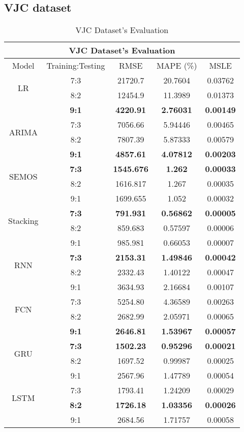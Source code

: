 \documentclass{ieeeojies}
\begin{document}
\subsection{VJC dataset} 
\begin{table}[H]
    \centering
    \begin{tabular}{|c|c|c|c|c|}
         \hline
         \multicolumn{5}{|c|}{\textbf{VJC Dataset's Evaluation}}\\
         \hline
         \centering Model & Training:Testing & RMSE & MAPE (\%) & MSLE\\
         \hline
         \multirow{2}{*}{LR} & 7:3 & 21720.7 & 20.7604 & 0.03762 \\ & 8:2 & 12454.9 & 11.3989 & 0.01373 \\ & \textbf{9:1} & \textbf{4220.91} & \textbf{2.76031} & \textbf{0.00149}\\
         \hline
         \multirow{2}{*}{ARIMA} & 7:3&7056.66&5.94446&0.00465\\ & 8:2&7807.39&5.87333&0.00579 \\ & \textbf{9:1} & \textbf{4857.61} & \textbf{4.07812} &\textbf{0.00203}\\
         \hline
         \multirow{2}{*}{SEMOS} & \textbf{7:3}	& \textbf{1545.676} & \textbf{1.262} & \textbf{0.00033} \\ & 8:2 & 1616.817 & 1.267 & 0.00035 \\ & 9:1 & 1699.655  & 1.052 & 0.00032\\
         \hline
         \multirow{2}{*}{Stacking} & \textbf{7:3} & \textbf{791.931} &  \textbf{0.56862} &  \textbf{0.00005} \\ & 8:2 &  859.683 & 0.57597 & 0.00006 \\ & 9:1 & 985.981 & 0.66053 & 0.00007\\
         \hline
         \multirow{2}{*}{RNN} & \textbf{7:3}	& \textbf{2153.31} & \textbf{1.49846} & \textbf{0.00042} \\ & 8:2 & 2332.43 & 1.40122 & 0.00047 \\ & 9:1 & 3634.93 & 2.16684 & 0.00107\\
         \hline
         \multirow{2}{*}{FCN} & 7:3 & 5254.80 & 4.36589 & 0.00263 \\ & 8:2 &	2682.99 & 2.05971 & 0.00065 \\ & \textbf{9:1} & \textbf{2646.81}	& \textbf{1.53967} & \textbf{0.00057}\\
         \hline
         \multirow{2}{*}{GRU} & \textbf{7:3} & \textbf{1502.23} & \textbf{0.95296} & \textbf{0.00021} \\ & 8:2 & 1697.52 & 0.99987 & 0.00025 \\ & 9:1 & 2567.96 & 1.47789 & 0.00054 \\
         \hline
         \multirow{2}{*}{LSTM} & 7:3 & 1793.41 &  1.24209 & 0.00029 \\ & \textbf{8:2} & \textbf{1726.18} &  \textbf{1.03356} &  \textbf{0.00026} \\ & 9:1 & 2684.56 & 1.71757 & 0.00058\\
         \hline
    \end{tabular}
    \caption{VJC Dataset's Evaluation}
    \label{vcbresult}
\end{table}
\end{document}

